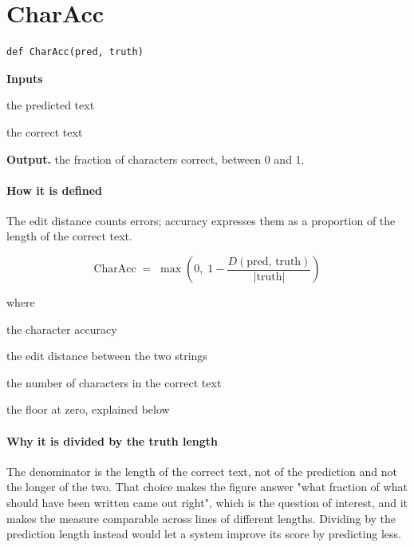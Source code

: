 \section{CharAcc}
\begin{lstlisting}[style=sig]
def CharAcc(pred, truth)
\end{lstlisting}

\noindent\textbf{Inputs}
\begin{description}[leftmargin=2.2em,style=nextline,font=\normalfont\ttfamily]\setlength\itemsep{1pt}
  \item[{pred}] \normalfont the predicted text
  \item[{truth}] \normalfont the correct text
\end{description}

\noindent\textbf{Output.} the fraction of characters correct, between 0 and 1.


\paragraph{How it is defined}
The edit distance counts errors; accuracy expresses them as a proportion of the length of the correct text.


\begin{equation}
\mathrm{CharAcc} \;=\; \max\!\left(0,\; 1 - \frac{D(\mathrm{pred},\,\mathrm{truth})}{|\mathrm{truth}|}\right)
\end{equation}

\noindent where
\begin{description}[leftmargin=2.4em,style=nextline,font=\normalfont\ttfamily]\setlength\itemsep{1pt}
  \item[{$\mathrm{CharAcc}$}] \normalfont the character accuracy
  \item[{$D$}] \normalfont the edit distance between the two strings
  \item[{$|\mathrm{truth}|$}] \normalfont the number of characters in the correct text
  \item[{$\max(0,\,\cdot)$}] \normalfont the floor at zero, explained below
\end{description}

\paragraph{Why it is divided by the truth length}
The denominator is the length of the correct text, not of the prediction and not the longer of the two. That choice makes the figure answer "what fraction of what should have been written came out right", which is the question of interest, and it makes the measure comparable across lines of different lengths. Dividing by the prediction length instead would let a system improve its score by predicting less.



